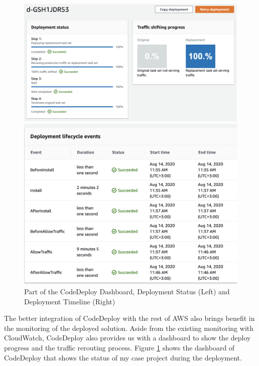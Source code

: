 \begin{figure}[!tbp]
     \centering
     \begin{minipage}[b]{0.50\textwidth}
       \includegraphics[width=\textwidth]{pics/codedeploy_steps.png}
     \end{minipage}
     \hfill
     \begin{minipage}[b]{0.48\textwidth}
       \includegraphics[width=\textwidth]{pics/codedeploy_time.png}
     \end{minipage}
     \caption{Part of the CodeDeploy Dashboard, Deployment Status (Left) and Deployment Timeline (Right)}
     \label{fig:codedeploy_steps}
\end{figure}
\par
The better integration of CodeDeploy with the rest of AWS also brings benefit in the monitoring of the deployed solution. Aside from the existing monitoring with CloudWatch, CodeDeploy also provides us with a dashboard to show the deploy progress and the traffic rerouting process. Figure \ref{fig:codedeploy_steps} shows the dashboard of CodeDeploy that shows the status of my case project during the deployment.
